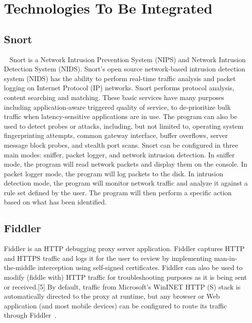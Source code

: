 {     \pv


\section{Technologies To Be Integrated}
\label{S:o-todo}

\subsection{Snort \cv}
~\cite{www-snort} Snort is a Network Intrusion Prevention System
(NIPS) and Network Intrusion Detection System (NIDS). Snort's open
source network-based intrusion detection system (NIDS) has the ability
to perform real-time traffic analysis and packet logging on Internet
Protocol (IP) networks. Snort performs protocol analysis, content
searching and matching. These basic services have many purposes
including application-aware triggered quality of service, to
de-prioritize bulk traffic when latency-sensitive applications are in
use.  The program can also be used to detect probes or attacks,
including, but not limited to, operating system fingerprinting
attempts, common gateway interface, buffer overflows, server message
block probes, and stealth port scans.  Snort can be configured in
three main modes: sniffer, packet logger, and network intrusion
detection. In sniffer mode, the program will read network packets and
display them on the console. In packet logger mode, the program will
log packets to the disk. In intrusion detection mode, the program will
monitor network traffic and analyze it against a rule set defined by
the user. The program will then perform a specific action based on
what has been identified.

\subsection{Fiddler}

Fiddler is an HTTP debugging proxy server application. Fiddler
captures HTTP and HTTPS traffic and logs it for the user to review by
implementing man-in-the-middle interception using self-signed
certificates. Fiddler can also be used to modify (fiddle with) HTTP
traffic for troubleshooting purposes as it is being sent or
received.[5] By default, traffic from Microsoft's WinINET HTTP (S)
stack is automatically directed to the proxy at runtime, but any
browser or Web application (and most mobile devices) can be configured
to route its traffic through Fiddler~\cite{www-fiddler}.

}
